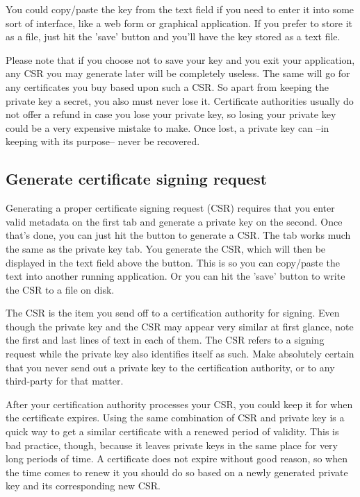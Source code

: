 \documentclass[a4paper,12pt]{article}
\begin{document}
You could copy/paste the key from the text field if you need to enter it into some sort of interface, like a web form or graphical application. If you prefer to store it as a file, just hit the 'save' button and you'll have the key stored as a text file.

Please note that if you choose not to save your key and you exit your application, any CSR you may generate later will be completely useless. The same will go for any certificates you buy based upon such a CSR. So apart from keeping the private key a secret, you also must never lose it. Certificate authorities usually do not offer a refund in case you lose your private key, so losing your private key could be a very expensive mistake to make. Once lost, a private key can --in keeping with its purpose-- never be recovered.

\subsection{Generate certificate signing request}
Generating a proper certificate signing request (CSR) requires that you enter valid metadata on the first tab and generate a private key on the second. Once that's done, you can just hit the button to generate a CSR. The tab works much the same as the private key tab. You generate the CSR, which will then be displayed in the text field above the button. This is so you can copy/paste the text into another running application. Or you can hit the 'save' button to write the CSR to a file on disk.

The CSR is the item you send off to a certification authority for signing. Even though the private key and the CSR may appear very similar at first glance, note the first and last lines of text in each of them. The CSR refers to a signing request while the private key also identifies itself as such. Make absolutely certain that you never send out a private key to the certification authority, or to any third-party for that matter.

After your certification authority processes your CSR, you could keep it for when the certificate expires. Using the same combination of CSR and private key is a quick way to get a similar certificate with a renewed period of validity. This is bad practice, though, because it leaves private keys in the same place for very long periods of time. A certificate does not expire without good reason, so when the time comes to renew it you should do so based on a newly generated private key and its corresponding new CSR.
\end{document}
